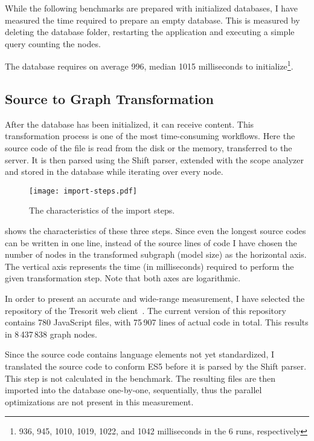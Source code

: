 While the following benchmarks are prepared with initialized databases, I have measured the time required to prepare an empty database. This is measured by deleting the database folder, restarting the application and executing a simple query counting the nodes.

The database requires on average 996, median 1015 milliseconds to initialize\footnote{936, 945, 1010, 1019, 1022, and 1042 milliseconds in the 6 runs, respectively}.

\subsection{Source to Graph Transformation}
After the database has been initialized, it can receive content. This transformation process is one of the most time-consuming workflows. Here the source code of the file is read from the disk or the memory, transferred to the server. It is then parsed using the Shift parser, extended with the scope analyzer and stored in the database while iterating over every node.

\begin{figure}[!htb]
  \centering
  \texttt{[image: import-steps.pdf]}
  \caption{The characteristics of the import steps.}
  \label{fig:import-steps}
\end{figure}

 shows the characteristics of these three steps. Since even the longest source codes can be written in one line, instead of the source lines of code I have chosen the number of nodes in the transformed subgraph (model size) as the horizontal axis. The vertical axis represents the time (in milliseconds) required to perform the given transformation step. Note that both axes are logarithmic.

In order to present an accurate and wide-range measurement, I have selected the repository of the Tresorit web client~\cite{tresorit-webclient}. The current version of this repository contains 780 JavaScript files, with 75\,907 lines of actual code in total. This results in 8\,437\,838 graph nodes.

Since the source code contains language elements not yet standardized, I translated the source code to conform ES5 before it is parsed by the Shift parser. This step is not calculated in the benchmark. The resulting files are then imported into the database one-by-one, sequentially, thus the parallel optimizations are not present in this measurement.

